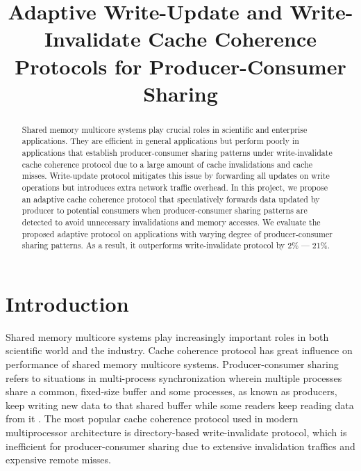 \documentclass[11pt,conference]{IEEEtran}
\begin{document}
%
\title{Adaptive Write-Update and Write-Invalidate Cache Coherence Protocols for Producer-Consumer Sharing}


\author{
\and
{}
}

\maketitle


\begin{abstract}
Shared memory multicore systems play crucial roles in scientific and enterprise applications. They are efficient in general applications but perform poorly in applications that establish producer-consumer sharing patterns under write-invalidate cache coherence protocol due to a large amount of cache invalidations and cache misses. Write-update protocol mitigates this issue by forwarding all updates on write operations but introduces extra network traffic overhead. In this project, we propose an adaptive cache coherence protocol that speculatively forwards data updated by producer to potential consumers when producer-consumer sharing patterns are detected to avoid unnecessary invalidations and memory accesses. We evaluate the proposed adaptive protocol on applications with varying degree of producer-consumer sharing patterns. As a result, it outperforms write-invalidate protocol by 2\% --- 21\%.
\end{abstract}


\section{Introduction}
Shared memory multicore systems play increasingly important roles in both scientific world and the industry. Cache coherence protocol has great influence on performance of shared memory multicore systems. Producer-consumer sharing refers to situations in multi-process synchronization wherein multiple processes share a common, fixed-size buffer and some processes, as known as producers, keep writing new data to that shared buffer while some readers keep reading data from it \cite{wiki}. The most popular cache coherence protocol used in modern multiprocessor architecture is directory-based write-invalidate protocol, which is inefficient for producer-consumer sharing due to extensive invalidation traffics and expensive remote misses.
\end{document}
